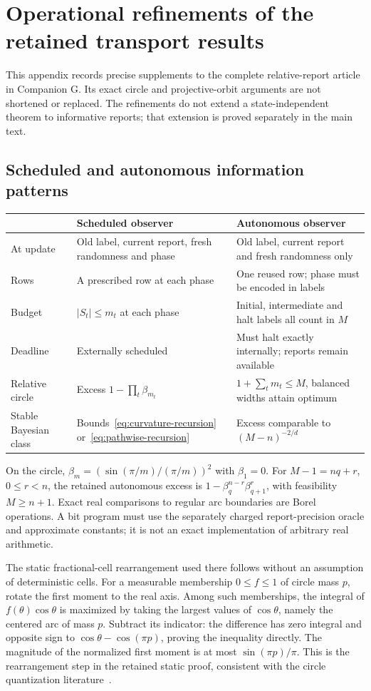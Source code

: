 \section{Operational refinements of the retained transport results}\label{sec:retained}
This appendix records precise supplements to the complete relative-report article in Companion G. Its exact circle and projective-orbit arguments are not shortened or replaced. The refinements do not extend a state-independent theorem to informative reports; that extension is proved separately in the main text.

\subsection{Scheduled and autonomous information patterns}
\begin{center}\small
\begin{tabular}{p{}p{}p{}}
\toprule
 & Scheduled observer & Autonomous observer\\
\midrule
At update & Old label, current report, fresh randomness and phase & Old label, current report and fresh randomness only\\[3pt]
Rows & A prescribed row at each phase & One reused row; phase must be encoded in labels\\[3pt]
Budget & $|S_t|\le m_t$ at each phase & Initial, intermediate and halt labels all count in $M$\\[3pt]
Deadline & Externally scheduled & Must halt exactly internally; reports remain available\\[3pt]
Relative circle & Excess $1-\prod_t\beta_{m_t}$ & $1+\sum_tm_t\le M$, balanced widths attain optimum\\[3pt]
Stable Bayesian class & Bounds~\eqref{eq:curvature-recursion} or~\eqref{eq:pathwise-recursion} & Excess comparable to $(M-n)^{-2/d}$\\
\bottomrule
\end{tabular}
\end{center}
On the circle, $\beta_m=(\sin(\pi/m)/(\pi/m))^2$ with $\beta_1=0$. For $M-1=nq+r$, $0\le r<n$, the retained autonomous excess is $1-\beta_q^{n-r}\beta_{q+1}^r$, with feasibility $M\ge n+1$. Exact real comparisons to regular arc boundaries are Borel operations. A bit program must use the separately charged report-precision oracle and approximate constants; it is not an exact implementation of arbitrary real arithmetic.

The static fractional-cell rearrangement used there follows without an assumption of deterministic cells. For a measurable membership $0\le f\le1$ of circle mass $p$, rotate the first moment to the real axis. Among such memberships, the integral of $f(\theta)\cos\theta$ is maximized by taking the largest values of $\cos\theta$, namely the centered arc of mass $p$. Subtract its indicator: the difference has zero integral and opposite sign to $\cos\theta-\cos(\pi p)$, proving the inequality directly. The magnitude of the normalized first moment is at most $\sin(\pi p)/\pi$. This is the rearrangement step in the retained static proof, consistent with the circle quantization literature~\cite{circle}.

